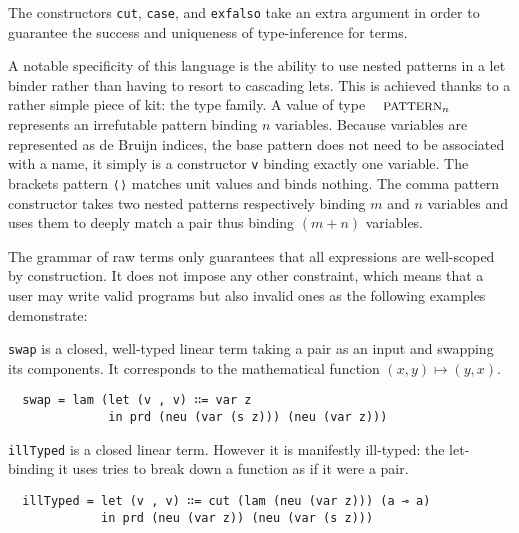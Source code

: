 \documentclass[a4paper,UKenglish]{lipics-v2016}
\begin{document}
The constructors \texttt{cut}, \texttt{case}, and \texttt{exfalso}
take an extra \Type{} argument in order to guarantee the success
and uniqueness of type-inference for \Inferable{} terms.

A notable specificity of this language is the ability to use nested
patterns in a let binder rather than having to resort to cascading
lets. This is achieved thanks to a rather simple piece of kit: the
\Pattern{} type family. A value of type $\Pattern{n}$ represents an
irrefutable pattern binding $n$ variables. Because variables are
represented as de Bruijn indices, the base pattern does not need to
be associated with a name, it simply is a constructor \texttt{v}
binding exactly one variable. The brackets pattern \texttt{⟨⟩} matches
unit values and binds nothing. The comma pattern constructor takes
two nested patterns respectively binding $m$ and $n$ variables and
uses them to deeply match a pair thus binding $(m + n)$ variables.


The grammar of raw terms only guarantees that all expressions are
well-scoped by construction. It does not impose any other constraint,
which means that a user may write valid programs but also invalid
ones as the following examples demonstrate:

\begin{example}\label{example:swap}
\texttt{swap} is a closed, well-typed linear term taking a pair as
an input and swapping its components. It corresponds to the mathematical
function $(x, y) \mapsto (y, x)$.
\begin{lstlisting}
  swap = lam (let (v , v) ∷= var z
              in prd (neu (var (s z))) (neu (var z)))
\end{lstlisting}
\end{example}

\begin{example}\label{example:illTyped}
\texttt{illTyped} is a closed linear term. However it is manifestly
ill-typed: the let-binding it uses tries to break down a function as
if it were a pair.
\begin{lstlisting}
  illTyped = let (v , v) ∷= cut (lam (neu (var z))) (a ⊸ a)
             in prd (neu (var z)) (neu (var (s z)))
\end{lstlisting}
\end{example}
\end{document}
